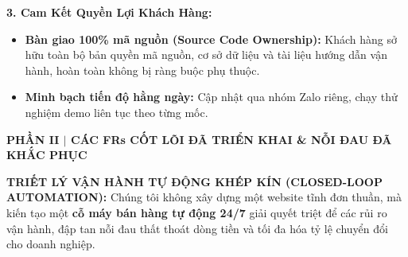 \documentclass[11pt,a4paper]{article}
\newcommand{\sectionbanner}[2]{%
  \vspace{1mm}%
  \begin{tcolorbox}[colback=primary,colframe=primary,arc=1.5mm,boxrule=0pt,top=2mm,bottom=2mm,left=3mm,right=3mm]
    {\large\bfseries\color{white} #1 \quad$\vert$\quad \normalsize\color{white} #2}
  \end{tcolorbox}%
  \vspace{1mm}%
}
\begin{document}
\vspace{1.2mm}
\noindent \textbf{\color{primary}\large 3. Cam Kết Quyền Lợi Khách Hàng:}
\begin{itemize}[leftmargin=*,itemsep=1.2pt,topsep=1pt]
    \item \textbf{Bàn giao 100\% mã nguồn (Source Code Ownership):} Khách hàng sở hữu toàn bộ bản quyền mã nguồn, cơ sở dữ liệu và tài liệu hướng dẫn vận hành, hoàn toàn không bị ràng buộc phụ thuộc.
    \item \textbf{Minh bạch tiến độ hằng ngày:} Cập nhật qua nhóm Zalo riêng, chạy thử nghiệm demo liên tục theo từng mốc.
\end{itemize}

\newpage

\sectionbanner{PHẦN II}{CÁC FRs CỐT LÕI ĐÃ TRIỂN KHAI \& NỖI ĐAU ĐÃ KHẮC PHỤC}

\begin{tcolorbox}[colback=tagbg,colframe=primary,arc=2mm,boxrule=0.8pt,top=1.8mm,bottom=1.8mm]
\small
\textbf{\color{primary} TRIẾT LÝ VẬN HÀNH TỰ ĐỘNG KHÉP KÍN (CLOSED-LOOP AUTOMATION):} Chúng tôi không xây dựng một website tĩnh đơn thuần, mà kiến tạo một \textbf{cỗ máy bán hàng tự động 24/7} giải quyết triệt để các rủi ro vận hành, đập tan nỗi đau thất thoát dòng tiền và tối đa hóa tỷ lệ chuyển đổi cho doanh nghiệp.
\end{tcolorbox}

\vspace{1mm}
\end{document}
